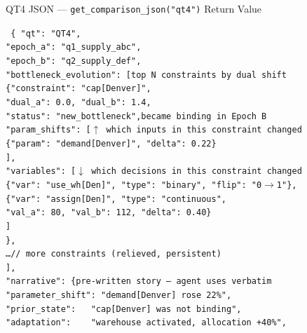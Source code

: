 \documentclass[aspectratio=169,10pt]{beamer}
\begin{document}
\begin{frame}[t]{QT4 JSON — \texttt{get\_comparison\_json("qt4")} Return Value}
\vspace{1pt}
\begin{block}{}
  \texttt{\scriptsize
    \{\,"qt": "QT4",\\
    \quad "epoch\_a": "q1\_supply\_abc",\\
    \quad "epoch\_b": "q2\_supply\_def",\\[2pt]
    \quad "bottleneck\_evolution": [\hfill\textcolor{mgray}{\tiny top N constraints by dual shift}\\[1pt]
    \quad\quad \{"constraint": "cap[Denver]",\\
    \quad\quad\quad "dual\_a": 0.0,\ "dual\_b": 1.4,\\
    \quad\quad\quad "status": "new\_bottleneck",\hfill\textcolor{ared}{\tiny became binding in Epoch B}\\[2pt]
    \quad\quad\quad "param\_shifts": [\hfill\textcolor{aorng}{\tiny $\uparrow$ which inputs in this constraint changed}\\
    \quad\quad\quad\quad \{"param": "demand[Denver]",\ "delta": 0.22\}\\
    \quad\quad\quad ],\\[2pt]
    \quad\quad\quad "variables": [\hfill\textcolor{purp}{\tiny $\downarrow$ which decisions in this constraint changed}\\
    \quad\quad\quad\quad \{"var": "use\_wh[Den]",\ "type": "binary",\ "flip": "0$\to$1"\},\\
    \quad\quad\quad\quad \{"var": "assign[Den]",\ "type": "continuous",\\
    \quad\quad\quad\quad\quad "val\_a": 80,\ "val\_b": 112,\ "delta": 0.40\}\\
    \quad\quad\quad ]\\
    \quad\quad \},\\
    \quad\quad \ldots\quad\textcolor{mgray}{// more constraints (relieved, persistent)}\\
    \quad ],\\[3pt]
    \quad "narrative": \{\hfill\textcolor{pblue}{\tiny pre-written story — agent uses verbatim}\\
    \quad\quad "parameter\_shift": "demand[Denver] rose 22\%",\\
    \quad\quad "prior\_state":\ \ \ "cap[Denver] was not binding",\\
    \quad\quad "adaptation":\ \ \ \ "warehouse activated, allocation +40\%",\\
}
\end{block}
\end{frame}
\end{document}
